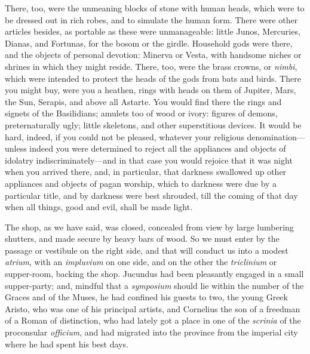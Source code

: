 There, too, were the unmeaning blocks of stone with human heads,
which were to be dressed out in rich robes, and to simulate the human
form. There were other articles besides, as portable as these were
unmanageable: little Junos, Mercuries, Dianas, and Fortunas, for the
bosom or the girdle. Household gods were there, and the objects of
personal devotion: Minerva or Vesta, with handsome niches or shrines
in which they might reside. There, too, were the brass crowns, or \emph{nimbi},
which were intended to protect the heads of the gods from bats and
birds. There you might buy, were you a heathen, rings with heads on
them of Jupiter, Mars, the Sun, Serapis, and above all Astarte. You
would find there the rings and signets of the Basilidians; amulets too
of wood or ivory: figures of demons, preternaturally ugly; little
skeletons, and other superstitious devices. It would be hard, indeed,
if you could not be pleased, whatever your religious denomination—unless
indeed you were determined to reject all the appliances and objects of
idolatry indiscriminately—and in that case you would rejoice that it
was night when you arrived there, and, in particular, that darkness
swallowed up other appliances and objects of pagan worship, which to
darkness were due by a particular title, and by darkness were best
shrouded, till the coming of that day when all things, good and evil,
shall be made light.

The shop, as we have said, was closed, concealed from view by large
lumbering shutters, and made secure by heavy bars of wood. So we must
enter by the passage or vestibule on the right side, and that
will conduct us into a modest \emph{atrium}, with an \emph{impluvium}
on one side, and on the other the \emph{triclinium} or supper-room,
backing the shop. Jucundus had been pleasantly engaged in a small
supper-party; and, mindful that a \emph{symposium} should lie within
the number of the Graces and of the Muses, he had confined his guests
to two, the young Greek Aristo, who was one of his principal artists,
and Cornelius the son of a freedman of a Roman of distinction, who had
lately got a place in one of the \emph{scrinia} of the proconsular \emph{officium},
and had migrated into the province from the imperial city where he had
spent his best days.

